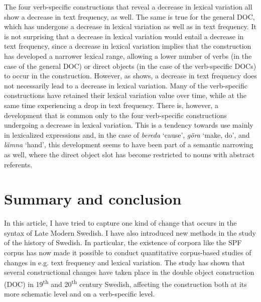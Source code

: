 \documentclass[output=paper]{langscibook}
\begin{document}
The four verb-specific constructions that reveal a decrease in lexical variation all show a decrease in text frequency, as well. The same is true for the general DOC, which has undergone a decrease in lexical variation as well as in text frequency. It is not surprising that a decrease in lexical variation would entail a decrease in text frequency, since a decrease in lexical variation implies that the construction has developed a narrower lexical range, allowing a lower number of verbs (in the case of the general DOC) or direct objects (in the case of the verb-specific DOCs) to occur in the construction. However, as  shows, a decrease in text frequency does not necessarily lead to a decrease in lexical variation. Many of the verb-specific constructions have retained their lexical variation value over time, while at the same time experiencing a drop in text frequency. There is, however, a development that is common only to the four verb-specific constructions undergoing a decrease in lexical variation. This is a tendency towards use mainly in lexicalized expressions and, in the case of \textit{bereda} ‘cause’, \textit{göra} ‘make, do’, and \textit{lämna} ‘hand’, this development seems to have been part of a semantic narrowing as well, where the direct object slot has become restricted to nouns with abstract referents.


\section{Summary and conclusion}\label{sec:valdeson:6}


In this article, I have tried to capture one kind of change that occurs in the syntax of Late Modern Swedish. I have also introduced new methods in the study of the history of Swedish. In particular, the existence of corpora like the SPF corpus has now made it possible to conduct quantitative corpus-based studies of changes in e.g. text frequency and lexical variation. The study has shown that several constructional changes have taken place in the double object construction (DOC) in 19\textsuperscript{th} and 20\textsuperscript{th} century Swedish, affecting the construction both at its more schematic level and on a verb-specific level. 
\end{document}
